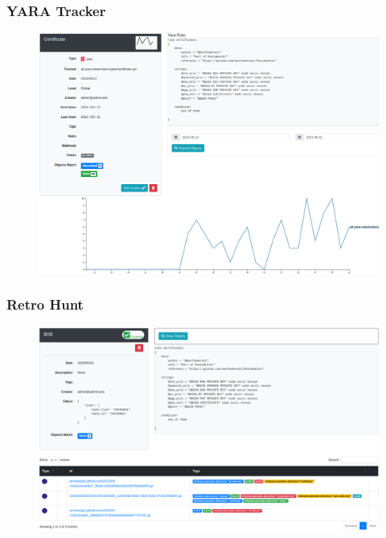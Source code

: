 \documentclass[10pt,aspectratio=169, colorlinks=true, linkcolor=circlBlue]{beamer}
\begin{document}
\begin{frame}
    \frametitle{YARA Tracker}
        \begin{figure}
            \includegraphics[scale=0.22]{screenshot/tracker_yara.png}
        \end{figure}
\end{frame}

\begin{frame}
    \frametitle{Retro Hunt}
        \begin{figure}
            \includegraphics[scale=0.22]{screenshot/retro_hunt.png}
        \end{figure}
\end{frame}
\end{document}
